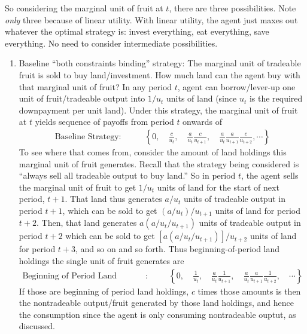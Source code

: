 \documentclass[12pt]{article}
\theoremstyle{plain}
\theoremstyle{definition}
\theoremstyle{remark}
\begin{document}
\begin{enumerate}
    So considering the marginal unit of fruit at $t$, there are three
    possibilities. Note \emph{only} three because of linear utility.
    With linear utility, the agent just maxes out whatever the optimal
    strategy is: invest everything, eat everything, save everything. No
    need to consider intermediate possibilities.
    \begin{enumerate}[label=(\roman*)]
      \item Baseline ``both constraints binding'' strategy:
        The marginal unit of tradeable fruit is sold to buy
        land/investment.
        How much land can the agent buy with that marginal unit of
        fruit? In any period $t$, agent can borrow/lever-up one unit of
        fruit/tradeable output into $1/u_t$ units of land (since $u_t$
        is the required downpayment per unit land). Under this strategy,
        the marginal unit of fruit at $t$ yields sequence of payoffs
        from period $t$ onwards of
        \begin{align*}
          \text{Baseline Strategy}:&\qquad
          \left\{
            0,
            \quad
            \frac{c}{u_t},
            \quad
            \frac{a}{u_t}
            \frac{c}{u_{t+1}}
            ,
            \quad
            \frac{a}{u_t}\frac{a}{u_{t+1}}\frac{c}{u_{t+2}},
            \cdots
          \right\}
        \end{align*}
        To see where that comes from, consider the amount of land
        holdings this marginal unit of fruit generates.  Recall that the
        strategy being considered is ``always sell all tradeable output
        to buy land.''
        So in period $t$, the agent sells the marginal unit of fruit to
        get $1/u_t$ units of land for the start of next period, $t+1$.
        That land thus generates $a/u_t$ units of tradeable output in
        period $t+1$, which can be sold to get $(a/u_t)/u_{t+1}$ units
        of land for period $t+2$.
        Then, that land generates $a(a/u_t/u_{t+1})$ units of tradeable
        output in period $t+2$ which can be sold to get
        $[a(a/u_t/u_{t+1})]/u_{t+2}$ units of land for period $t+3$, and
        so on and so forth.
        Thus beginning-of-period land holdings the single unit of
        fruit generates are
        \begin{align*}
          \text{Beginning of Period Land Holdings}:&\qquad
          \left\{
            0,
            \quad
            \frac{1}{u_t},
            \quad
            \frac{a}{u_t}
            \frac{1}{u_{t+1}}
            ,
            \quad
            \frac{a}{u_t}
            \frac{a}{u_{t+1}}
            \frac{1}{u_{t+2}}
            ,
            \quad
            \cdots
          \right\}
        \end{align*}
        If those are beginning of period land holdings, $c$ times those
        amounts is then the nontradeable output/fruit generated by those
        land holdings, and hence the consumption since the agent is only
        consuming nontradeable ouptut, as discussed.


\end{enumerate}
\end{enumerate}
\end{document}
